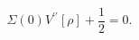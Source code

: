 \begin{equation}
\Sigma(0) V^{\prime \prime} [\rho] + \frac{1}{2} = 0. \label{eq:detzero}
\end{equation}

